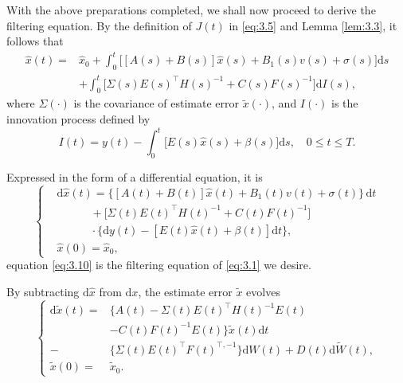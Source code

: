 \documentclass[lettersize,journal]{IEEEtran}
\theoremstyle{plain}
\theoremstyle{definition}
\begin{document}
With the above preparations completed, we shall now proceed to derive the filtering equation. By the definition of $J(t)$ in \eqref{eq:3.5} and Lemma \ref{lem:3.3}, it follows that 
\begin{equation*}
	\begin{aligned}
		\widehat{x}(t) = &\widehat{x}_0 + \int_{0}^{t} \Big[[A(s)+B(s)]\widehat{x}(s) + B_1(s)v(s) + \sigma(s)\Big]\mathrm{d}s\\
		& + \int_{0}^{t} \Big[\Sigma(s)E(s)^\top H(s)^{-1} + C(s)F(s)^{-1}\Big]\mathrm{d}I(s),
	\end{aligned}
\end{equation*}
where $\Sigma(\cdot)$ is the covariance of estimate error $\widetilde{x}(\cdot)$, and $I(\cdot)$ is the innovation process defined by 
\begin{equation*}
	I(t) = y(t) - \int_{0}^{t} \Big[E(s)\widehat{x}(s) + \beta(s)\Big]\mathrm{d}s, \quad 0\leq t \leq T.
\end{equation*}

Expressed in the form of a differential equation, it is
\begin{equation}\label{eq:3.10}
	\left\{
	\begin{aligned}
		&\mathrm{d}\widehat{x}(t) = \Big\{[A(t) + B(t)]\widehat{x}(t) + B_1(t)v(t) + \sigma(t)\Big\}\,\mathrm{d}t \\
		&\quad\qquad + \Big[\Sigma(t)E(t)^{\top}H(t)^{-1} + C(t)F(t)^{-1}\Big] \\
		&\quad\qquad \cdot \Big\{\mathrm{d}y(t) - [E(t)\widehat{x}(t) + \beta(t)]\mathrm{d}t\Big\},\\
		&\widehat{x}(0) = \widehat{x}_0,
	\end{aligned}
	\right.
\end{equation}
equation \eqref{eq:3.10} is the filtering equation of \eqref{eq:3.1} we desire.

By subtracting $\mathrm{d}\widehat{x}$ from $\mathrm{d}x$, the estimate error $\widetilde{x}$ evolves
\begin{equation}\label{eq:3.11}
	\left\{
	\begin{aligned}
		\mathrm{d}\widetilde{x}(t) =& \Big\{A(t) - \Sigma(t)E(t)^{\top}H(t)^{-1}E(t) \\
		&- C(t)F(t)^{-1}E(t)\Big\}\widetilde{x}(t)\mathrm{d}t\\
		-& \Big\{\Sigma(t)E(t)^{\top}F(t)^{\top,-1}\Big\}\mathrm{d}W(t) + D(t)\mathrm{d}\widetilde{W}(t),\\
		\widetilde{x}(0) = &\widetilde{x}_0.
	\end{aligned}
	\right.
\end{equation}
\end{document}
